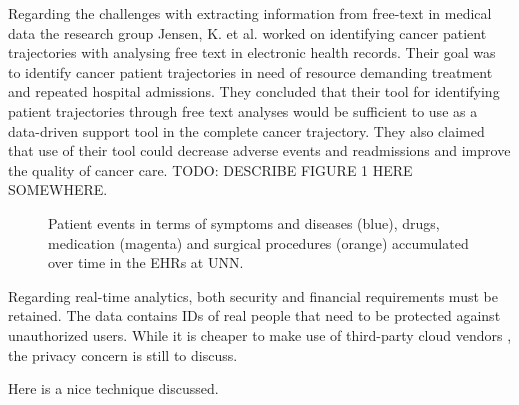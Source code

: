 Regarding the challenges with extracting information from free-text in medical data the research group Jensen, K. et al.\cite{freetext} worked on identifying cancer patient trajectories with analysing free text in electronic health records. Their goal was to identify cancer patient trajectories in need of resource demanding treatment and repeated hospital admissions. They concluded that their tool for identifying patient trajectories through free text analyses would be sufficient to use as a data-driven support tool in the complete cancer trajectory. They also claimed that use of their tool could decrease adverse events and readmissions and improve the quality of cancer care. 
TODO: DESCRIBE FIGURE 1 HERE SOMEWHERE. 

\begin{figure}[]
\begin{center}
\end{center}
\caption{Patient events in terms of symptoms and diseases (blue), drugs, medication (magenta) and surgical procedures (orange) accumulated over time in the EHRs at UNN.\cite{freetext}}\label{fig:ackseq}
\end{figure}

Regarding real-time analytics, both security and financial requirements must be retained. The data contains IDs of real people that need to be protected against unauthorized users. While it is cheaper to make use of third-party cloud vendors \cite{vendors}, the privacy concern is still to discuss. 

Here is a nice technique discussed.\cite{medicalmining}


